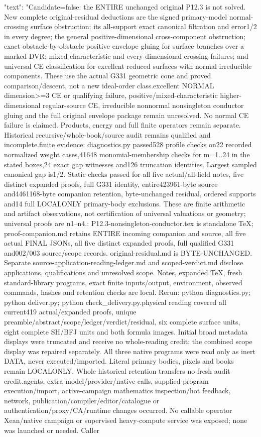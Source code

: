 \documentclass[11pt]{article}
\begin{document}
\begin{Full422Data}
{  "text": "Candidate=false: the ENTIRE unchanged original P12.3 is not solved. New complete original-residual deductions are the signed primary-model normal-crossing surface obstruction; its all-support exact canonical filtration and error1/2 in every degree; the general positive-dimensional cross-component obstruction; exact obstacle-by-obstacle positive envelope gluing for surface branches over a marked DVR; mixed-characteristic and every-dimensional crossing failures; and universal CE classification for excellent reduced surfaces with normal irreducible components. These use the actual G331 geometric cone and proved comparison/descent, not a new ideal-order class.\n\nGeneral excellent NORMAL dimension>=3 CE or qualifying failure, positive/mixed-characteristic higher-dimensional regular-source CE, irreducible nonnormal nonsingleton conductor gluing and the full original envelope package remain unresolved. No normal CE failure is claimed. Products, energy and full finite operators remain separate. Historical recursive/whole-book/source audit remains qualified and incomplete.\n\nObserved finite evidence: diagnostics.py passed528 profile checks on22 recorded normalized weight cases,41648 monomial-membership checks for m=1..24 in the stated boxes,24 exact gap witnesses and126 truncation identities. Largest sampled canonical gap is1/2. Static checks passed for all five actual/all-field notes, five distinct expanded proofs, full G331 identity, entire423961-byte source and4461168-byte companion retention, byte-unchanged residual, ordered supports and14 full LOCALONLY primary-body exclusions. These are finite arithmetic and artifact observations, not certification of universal valuations or geometry; universal proofs are n1--n4.\n\nDeliverables: P12.3-nonsingleton-conductor.tex is standalone TeX; proof-companion.md retains ENTIRE incoming companion and source, all five actual FINAL JSONs, all five distinct expanded proofs, full qualified G331 and002/003 source/scope records. original-residual.md is BYTE-UNCHANGED. Separate source-application-reading-ledger.md and scoped-verdict.md disclose applications, qualifications and unresolved scope. Notes, expanded TeX, fresh standard-library programs, exact finite inputs/output, environment, observed commands, hashes and retention checks are local. Rerun: python diagnostics.py; python deliver.py; python check_delivery.py.\n\nFresh physical reading covered all current419 actual/expanded proofs, unique preamble/abstract/scope/ledger/verdict/residual, six complete surface units, eight complete SH/BFJ units and both formula images. Initial broad metadata displays were truncated and receive no whole-reading credit; the combined scope display was repaired separately. All three native programs were read only as inert DATA, never executed/imported. Literal primary bodies, pixels and books remain LOCALONLY. Whole historical retention transfers no fresh audit credit.\n\nNo agents, extra model/provider/native calls, supplied-program execution/import, active-campaign mathematics inspection/hot feedback, network, publication/compiler/editor/catalogue or authentication/proxy/CA/runtime changes occurred. No callable operator Xean/native campaign or supervised heavy-compute service was exposed; none was launched or needed. Caller }
\end{Full422Data}
\end{document}
